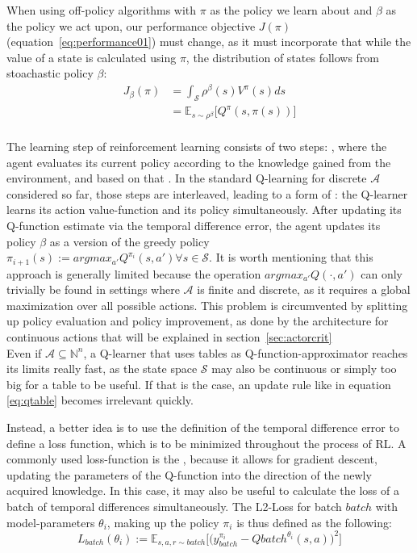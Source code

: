 When using off-policy algorithms with $\pi$ as the policy we learn about and $\beta$ as the policy we act upon, our performance objective $J(\pi)$ (equation~\ref{eq:performance01}) must change, as it must incorporate that while the value of a state is calculated using $\pi$, the distribution of states follows from stoachastic policy $\beta$: 
\begin{align} 
	J_\beta(\pi) &= \int_{\mathcal{S}} \rho^\beta(s) V^\pi(s) ds \nonumber\\
	&= \mathds{E}_{s\sim\rho^\beta} \big[Q^\pi(s, \pi(s)) \big] \label{eq:performance}
\end{align}\\

The learning step of reinforcement learning consists of two steps: , where the agent evaluates its current policy according to the knowledge gained from the environment, and based on that . In the standard Q-learning for discrete $\mathcal{A}$ considered so far, those steps are interleaved, leading to a form of : the Q-learner learns its action value-function and its policy simultaneously. After updating its Q-function estimate via the temporal difference error, the agent updates its policy $\beta$ as a  version of the greedy policy $\pi_{i+1}(s) := argmax_{a'} Q^{\pi_i}(s,a') \forall s \in \mathcal{S}$. It is worth mentioning that this approach is generally limited because the  operation $argmax_{a'}Q(\cdot, a')$ can only trivially be found in settings where $\mathcal{A}$ is finite and discrete, as it requires a global maximization over all possible actions. This problem is circumvented by splitting up policy evaluation and policy improvement, as done by the architecture for continuous actions that will be explained in section~\ref{sec:actorcrit}\\

Even if $\mathcal{A} \subseteq \mathds{N}^n$, a Q-learner that uses tables as Q-function-approximator reaches its limits really fast, as the state space $\mathcal{S}$ may also be continuous or simply too big for a table to be useful. If that is the case, an update rule like in equation \ref{eq:qtable} becomes irrelevant quickly. 

Instead, a better idea is to use the definition of the temporal difference error to define a loss function, which is to be minimized throughout the process of RL. A commonly used loss-function is the , because it allows for gradient descent, updating the parameters of the Q-function into the direction of the newly acquired knowledge. In this case, it may also be useful to calculate the loss of a batch of temporal differences simultaneously. The L2-Loss for batch $batch$ with model-parameters $\theta_i$, making up the policy $\pi_i$ is thus defined as the following: 
\begin{equation} \label{l2loss}
	L_{batch}(\theta_i) := \mathds{E}_{s,a,r \sim batch} \Big[ \big( y_{batch}^{\pi_i} - Q{batch}^{\theta_i}(s, a)\big)^2 \Big]
\end{equation}







